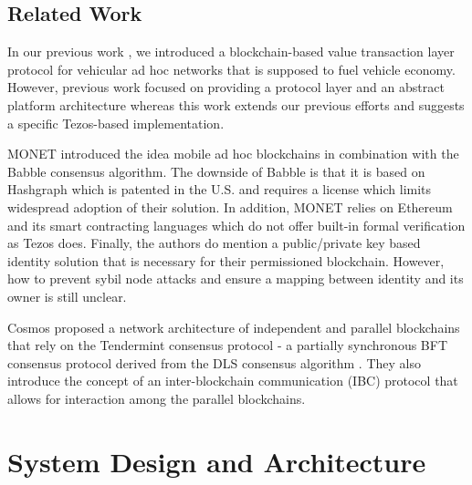\documentclass{llncs}
\begin{document}
{%
	
			
		
		\subsection{Related Work}
			\label{ss:related-work}

			In our previous work \cite{chorusWhitepaper}\cite{chorus2018MCIS}, we introduced a blockchain-based value transaction layer protocol for vehicular ad hoc networks that is supposed to fuel vehicle economy. However, previous work focused on providing a protocol layer and an abstract platform architecture whereas this work extends our previous efforts and suggests a specific Tezos-based implementation.

			MONET \cite{monetWhitepaper} introduced the idea mobile ad hoc blockchains in combination with the Babble consensus algorithm. The downside of Babble is that it is based on Hashgraph \cite{hashgraphWhitepaper} which is patented in the U.S. and requires a license which limits widespread adoption of their solution. In addition, MONET relies on Ethereum and its smart contracting languages which do not offer built-in formal verification as Tezos does. Finally, the authors do mention a public/private key based identity solution that is necessary for their permissioned blockchain. However, how to prevent sybil node attacks and ensure a mapping between identity and its owner is still unclear.

			Cosmos \cite{cosmosWhitepaper} proposed a network architecture of independent and parallel blockchains that rely on the Tendermint consensus protocol - a partially synchronous BFT consensus protocol derived from the DLS consensus algorithm \cite{dwork1988consensus}. They also introduce the concept of an inter-blockchain communication (IBC) protocol that allows for interaction among the parallel blockchains.
			
		


	\section{System Design and Architecture}
		\label{s:section-3}
		
}
\end{document}
